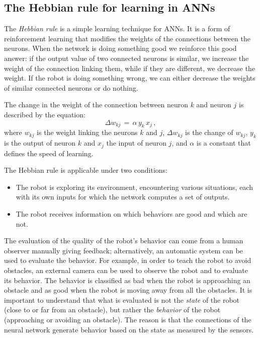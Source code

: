 \subsection{The Hebbian rule for learning in ANNs}\label{s.hebbian-rule}

The \emph{Hebbian rule} is a simple learning technique for ANNs. It is a form of reinforcement learning that modifies the weights of the connections between the neurons. When the network is doing something good we reinforce this good answer: if the output value of two connected neurons is similar, we increase the weight of the connection linking them, while if they are different, we decrease the weight. If the robot is doing something wrong, we can either decrease the weights of similar connected neurons or do nothing.

The change in the weight of the connection between neuron $k$ and neuron $j$ is described by the equation:
\[
\Delta w_{kj}\,=\,\alpha \, y_{k} \, x_{j}\,,\label{eq.hebbian}
\]
where $w_{kj}$ is the weight linking the neurons $k$ and $j$, $\Delta w_{kj}$ is the change of $w_{kj}$, $y_{k}$ is the output of neuron $k$ and $x_{j}$ the input of neuron $j$, and $\alpha$ is a constant that defines the speed of learning. 

The Hebbian rule is applicable under two conditions:
\begin{itemize}
\item The robot is exploring its environment, encountering various situations, each with its own inputs for which the network computes a set of outputs.
\item The robot receives information on which behaviors are good and which are not.
\end{itemize}
The evaluation of the quality of the robot's behavior can come from a human observer manually giving feedback; alternatively, an automatic system can be used to evaluate the behavior. For example, in order to teach the robot to avoid obstacles, an external camera can be used to observe the robot and to evaluate its behavior. The behavior is classified as bad when the robot is approaching an obstacle and as good when the robot is moving away from all the obstacles. It is important to understand that what is evaluated is not the \emph{state} of the robot (close to or far from an obstacle), but rather the \emph{behavior} of the robot (approaching or avoiding an obstacle). The reason is that the connections of the neural network generate behavior based on the state as measured by the sensors.

